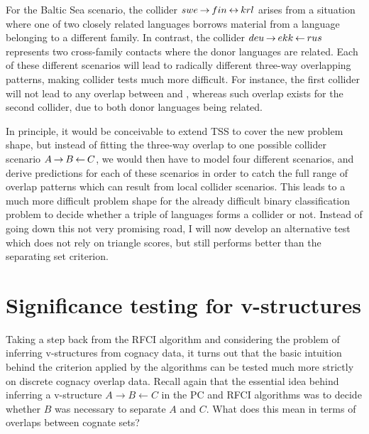 For the Baltic Sea scenario, the collider $swe \kern 2pt\hbox{$\rightarrow$}\kern 2pt fin \kern 2pt\hbox{$\leftrightarrow$}\kern 2pt krl$ arises from a situation where one of two closely related languages borrows material from a language belonging to a different family. In contrast, the collider $deu \kern 2pt\hbox{$\rightarrow$}\kern 2pt ekk \kern 2pt\hbox{$\leftarrow$}\kern 2pt rus$ represents two cross-family contacts where the donor languages are related. Each of these different scenarios will lead to radically different three-way overlapping patterns, making collider tests much more difficult. For instance, the first collider will not lead to any overlap between  and , whereas such overlap exists for the second collider, due to both donor languages being related.

In principle, it would be conceivable to extend TSS to cover the new problem shape, but instead of fitting the three-way overlap to one possible collider scenario $A \kern 2pt\hbox{$\rightarrow$}\kern 2pt B \kern 2pt\hbox{$\leftarrow$}\kern 2pt C$, we would then have to model four different scenarios, and derive predictions for each of these scenarios in order to catch the full range of overlap patterns which can result from local collider scenarios. This leads to a much more difficult problem shape for the already difficult binary classification problem to decide whether a triple of languages forms a collider or not. Instead of going down this not very promising road, I will now develop an alternative test which does not rely on triangle scores, but still performs better than the separating set criterion.
 
\section{Significance testing for v-structures}\label{sec:7.4}
Taking a step back from the RFCI algorithm and considering the problem of inferring v-structures from cognacy data, it turns out that the basic intuition behind the criterion applied by the algorithms can be tested much more strictly on discrete cognacy overlap data. Recall again that the essential idea behind inferring a v-structure $A \rightarrow B \leftarrow C$ in the PC and RFCI algorithms was to decide whether $B$ was necessary to separate $A$ and $C$. What does this mean in terms of overlaps between cognate sets?

